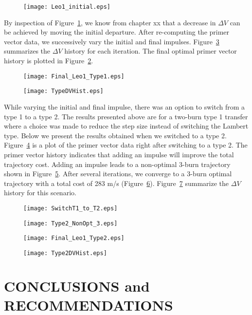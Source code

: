 \documentclass[12pt]{report}
\begin{document}
\begin{figure}[htb]
\centerline{\texttt{[image: Leo1\_initial.eps]}}\label{leo1ini}
\end{figure}

\noindent By inspection of Figure~\ref{leo1ini}, we know from
chapter xx that a decrease in $\Delta V$ can be achieved by moving
the initial departure. After re-computing the primer vector data,
we successively vary the initial and final impulses.
Figure~\ref{dvhist} summarizes the $\Delta V$ history for each
iteration. The final optimal primer vector history is plotted in
Figure~\ref{leo1final}.

\begin{figure}
\centerline{\texttt{[image: Final\_Leo1\_Type1.eps]}}\label{leo1final}
\end{figure}

\begin{figure}
\centerline{\texttt{[image: TypeDVHist.eps]}}\label{dvhist}
\end{figure}

\noindent While varying the initial and final impulse, there was
an option to switch from a type 1 to a type 2. The results
presented above are for a two-burn type 1 transfer where a choice
was made to reduce the step size instead of switching the Lambert
type. Below we present the results obtained when we switched to a
type 2. Figure~\ref{swt1t2} is a plot of the primer vector data
right after switching to a type 2. The primer vector history
indicates that adding an impulse will improve the total trajectory
cost. Adding an impulse leads to a non-optimal 3-burn trajectory
shown in Figure~\ref{nopt3}. After several iterations, we converge
to a 3-burn optimal trajectory with a total cost of 283 m/s
(Figure~\ref{leo1fin2}). Figure~\ref{dvhist2} summarize the
$\Delta V$ history for this scenario.
\begin{figure}
\centerline{\texttt{[image: SwitchT1\_to\_T2.eps]}}\label{swt1t2}
\end{figure}

\begin{figure}
\centerline{\texttt{[image: Type2\_NonOpt\_3.eps]}}\label{nopt3}
\end{figure}

\begin{figure}
\centerline{\texttt{[image: Final\_Leo1\_Type2.eps]}}\label{leo1fin2}
\end{figure}

\begin{figure}
\centerline{\texttt{[image: Type2DVHist.eps]}}\label{dvhist2}
\end{figure}




\chapter{CONCLUSIONS and RECOMMENDATIONS}





\end{document}
